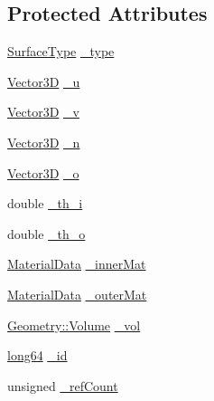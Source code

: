 \subsection*{Protected Attributes}
\begin{DoxyCompactItemize}
\item 
\hyperlink{class_d_d_surfaces_1_1_surface_type}{Surface\+Type} \hyperlink{class_d_d4hep_1_1_d_d_rec_1_1_vol_surface_base_a7a377fec84bd131b42eb0fb672585850}{\+\_\+type}
\item 
\hyperlink{class_d_d_surfaces_1_1_vector3_d}{Vector3D} \hyperlink{class_d_d4hep_1_1_d_d_rec_1_1_vol_surface_base_a15a2648f8b9ead47a28826e4ad0cc6c7}{\+\_\+u}
\item 
\hyperlink{class_d_d_surfaces_1_1_vector3_d}{Vector3D} \hyperlink{class_d_d4hep_1_1_d_d_rec_1_1_vol_surface_base_afc7d4d47e7fa6c7a8c87a52e15177bdb}{\+\_\+v}
\item 
\hyperlink{class_d_d_surfaces_1_1_vector3_d}{Vector3D} \hyperlink{class_d_d4hep_1_1_d_d_rec_1_1_vol_surface_base_a9371dc34ec00ff652bc4e0ae1423364c}{\+\_\+n}
\item 
\hyperlink{class_d_d_surfaces_1_1_vector3_d}{Vector3D} \hyperlink{class_d_d4hep_1_1_d_d_rec_1_1_vol_surface_base_a2a59cf024e571ecddb719beadca6aa5e}{\+\_\+o}
\item 
double \hyperlink{class_d_d4hep_1_1_d_d_rec_1_1_vol_surface_base_a50793721953f298992a3c98f3b77053d}{\+\_\+th\+\_\+i}
\item 
double \hyperlink{class_d_d4hep_1_1_d_d_rec_1_1_vol_surface_base_ab60dbb9ad72a790cbfa119edaa225e36}{\+\_\+th\+\_\+o}
\item 
\hyperlink{class_d_d4hep_1_1_d_d_rec_1_1_material_data}{Material\+Data} \hyperlink{class_d_d4hep_1_1_d_d_rec_1_1_vol_surface_base_abfa00728ddc6fc977fb9d297038448c2}{\+\_\+inner\+Mat}
\item 
\hyperlink{class_d_d4hep_1_1_d_d_rec_1_1_material_data}{Material\+Data} \hyperlink{class_d_d4hep_1_1_d_d_rec_1_1_vol_surface_base_a3745bfba5f2d3b296e4f628c399faa39}{\+\_\+outer\+Mat}
\item 
\hyperlink{class_d_d4hep_1_1_geometry_1_1_volume}{Geometry\+::\+Volume} \hyperlink{class_d_d4hep_1_1_d_d_rec_1_1_vol_surface_base_afbd867fb78d3da533b12850d152005c2}{\+\_\+vol}
\item 
\hyperlink{namespace_d_d_surfaces_ab6b3da366f31f80aec56447ac4442e78}{long64} \hyperlink{class_d_d4hep_1_1_d_d_rec_1_1_vol_surface_base_ab8b2a71397c0d4c0be2683aabb4e7882}{\+\_\+id}
\item 
unsigned \hyperlink{class_d_d4hep_1_1_d_d_rec_1_1_vol_surface_base_a89b8556764cf2684ba0f96dfdd6a674e}{\+\_\+ref\+Count}
\end{DoxyCompactItemize}
